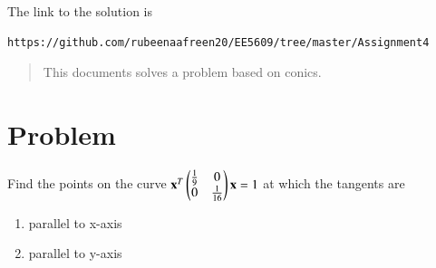 \documentclass[journal,12pt,twocolumn]{IEEEtran}
\begin{document}
The link to the solution is
\begin{lstlisting}
https://github.com/rubeenaafreen20/EE5609/tree/master/Assignment4
\end{lstlisting}
\begin{abstract}
This documents solves a problem based on conics.
\end{abstract}
\section{Problem}
Find the points on the curve $\mathbf{x}^{T}\begin{pmatrix}\frac{1}{9} & 0 \\ 0 & \frac{1}{16}\end{pmatrix}\mathbf{x}=1$ at which the tangents are
\begin{enumerate}[label=\alph*)]
    \item parallel to x-axis
    \item parallel to y-axis
\end{enumerate}
\end{document}
